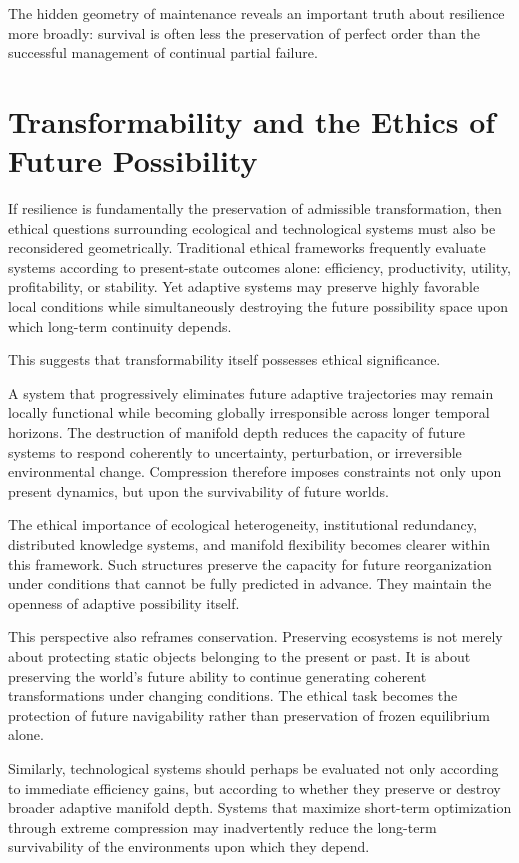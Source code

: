 \documentclass[11pt,a4paper]{article}
\begin{document}
The hidden geometry of maintenance reveals an important truth about resilience more broadly: survival is often less the preservation of perfect order than the successful management of continual partial failure.

\newpage

\section{Transformability and the Ethics of Future Possibility}

If resilience is fundamentally the preservation of admissible transformation, then ethical questions surrounding ecological and technological systems must also be reconsidered geometrically. Traditional ethical frameworks frequently evaluate systems according to present-state outcomes alone: efficiency, productivity, utility, profitability, or stability. Yet adaptive systems may preserve highly favorable local conditions while simultaneously destroying the future possibility space upon which long-term continuity depends.

This suggests that transformability itself possesses ethical significance.

A system that progressively eliminates future adaptive trajectories may remain locally functional while becoming globally irresponsible across longer temporal horizons. The destruction of manifold depth reduces the capacity of future systems to respond coherently to uncertainty, perturbation, or irreversible environmental change. Compression therefore imposes constraints not only upon present dynamics, but upon the survivability of future worlds.

The ethical importance of ecological heterogeneity, institutional redundancy, distributed knowledge systems, and manifold flexibility becomes clearer within this framework. Such structures preserve the capacity for future reorganization under conditions that cannot be fully predicted in advance. They maintain the openness of adaptive possibility itself.

This perspective also reframes conservation. Preserving ecosystems is not merely about protecting static objects belonging to the present or past. It is about preserving the world's future ability to continue generating coherent transformations under changing conditions. The ethical task becomes the protection of future navigability rather than preservation of frozen equilibrium alone.

Similarly, technological systems should perhaps be evaluated not only according to immediate efficiency gains, but according to whether they preserve or destroy broader adaptive manifold depth. Systems that maximize short-term optimization through extreme compression may inadvertently reduce the long-term survivability of the environments upon which they depend.
\end{document}
